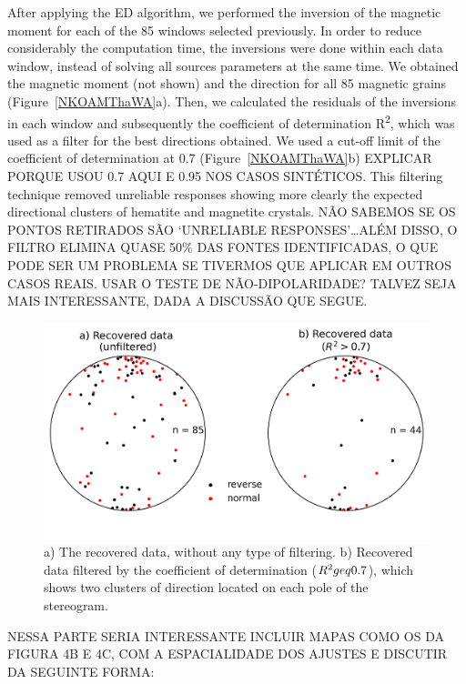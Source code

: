 After applying the ED algorithm, we performed the inversion of the magnetic
moment for each of the 85 windows selected previously. In order to reduce
considerably the computation time, the inversions were done within each data
window, instead of solving all sources parameters at the same time. We obtained
the magnetic moment (not shown) and the direction for all 85 magnetic grains
(Figure~\ref{NKOAMThaWA}a). Then, we calculated the residuals of the inversions
in each window and subsequently the coefficient of determination
R\textsuperscript{2}, which was used as a filter for the best directions
obtained. We used a cut-off limit of the coefficient of determination at 0.7
(Figure~\ref{NKOAMThaWA}b) EXPLICAR PORQUE USOU 0.7 AQUI E 0.95 NOS CASOS
SINTÉTICOS. This filtering technique removed unreliable responses showing more
clearly the expected directional clusters of hematite and magnetite crystals.
NÃO SABEMOS SE OS PONTOS RETIRADOS SÃO `UNRELIABLE RESPONSES'\dots ALÉM DISSO,
O FILTRO ELIMINA QUASE 50\% DAS FONTES IDENTIFICADAS, O QUE PODE SER UM
PROBLEMA SE TIVERMOS QUE APLICAR EM OUTROS CASOS REAIS. USAR O TESTE DE
NÃO-DIPOLARIDADE? TALVEZ SEJA MAIS INTERESSANTE, DADA A DISCUSSÃO QUE SEGUE.

\begin{figure}[tb]
\centering
\includegraphics[width=1\linewidth]{figures/RealDataStereo.png}
\caption{
a) The recovered data, without any type of filtering. b) Recovered data
filtered by the coefficient of determination ($R^ 2 \\geq 0.7$), which shows
two clusters of direction located on each pole of the stereogram.
}
\label{nkoamthawa}
\end{figure}

NESSA PARTE SERIA INTERESSANTE INCLUIR MAPAS COMO OS DA FIGURA 4B E 4C, COM A
ESPACIALIDADE DOS AJUSTES E DISCUTIR DA SEGUINTE FORMA:

